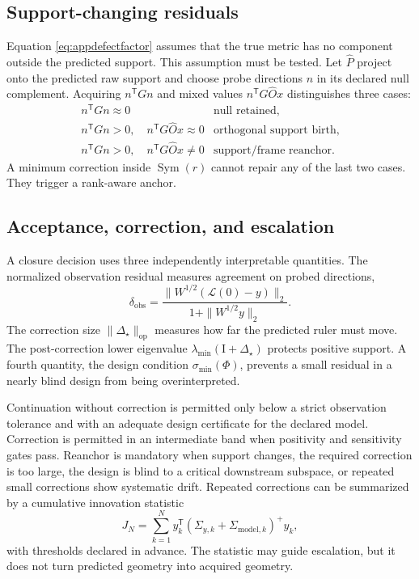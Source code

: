\documentclass[10pt,twocolumn]{article}
\theoremstyle{definition}
\theoremstyle{remark}
\newcommand{\Id}{\mathrm I}
\newcommand{\op}{\mathrm{op}}
\begin{document}
\subsection{Support-changing residuals}

Equation \eqref{eq:appdefectfactor} assumes that the true metric has no
component outside the predicted support.  This assumption must be tested.
Let $\widehat P$ project onto the predicted raw support and choose probe
directions $n$ in its declared null complement.  Acquiring
$n^{\mathsf T}Gn$ and mixed values
$n^{\mathsf T}G\widehat O x$ distinguishes three cases:
\begin{equation}
\begin{array}{cl}
n^{\mathsf T}Gn\approx0
&\text{null retained},\\
n^{\mathsf T}Gn>0,\quad
n^{\mathsf T}G\widehat O x\approx0
&\text{orthogonal support birth},\\
n^{\mathsf T}Gn>0,\quad
n^{\mathsf T}G\widehat O x\neq0
&\text{support/frame reanchor}.
\end{array}
\label{eq:appsupportcases}
\end{equation}
A minimum correction inside $\operatorname{Sym}(r)$ cannot repair any of the
last two cases.  They trigger a rank-aware anchor.

\subsection{Acceptance, correction, and escalation}

A closure decision uses three independently interpretable quantities.  The
normalized observation residual measures agreement on probed directions,
\begin{equation}
 \delta_{\mathrm{obs}}
 =\frac{\|W^{1/2}(\mathcal L(0)-y)\|_2}
 {1+\|W^{1/2}y\|_2}.
 \label{eq:appobsres}
\end{equation}
The correction size $\|\Delta_\star\|_{\op}$ measures how far the predicted
ruler must move.  The post-correction lower eigenvalue
$\lambda_{\min}(\Id+\Delta_\star)$ protects positive support.  A fourth
quantity, the design condition $\sigma_{\min}(\Phi)$, prevents a small
residual in a nearly blind design from being overinterpreted.

Continuation without correction is permitted only below a strict observation
tolerance and with an adequate design certificate for the declared model.
Correction is permitted in an intermediate band when positivity and
sensitivity gates pass.  Reanchor is mandatory when support changes, the
required correction is too large, the design is blind to a critical
downstream subspace, or repeated small corrections show systematic drift.
Repeated corrections can be summarized by a cumulative innovation statistic
\begin{equation}
 J_N=\sum_{k=1}^N
 y_k^{\mathsf T}
 (\Sigma_{y,k}+\Sigma_{\mathrm{model},k})^+
 y_k ,
 \label{eq:appinnovation}
\end{equation}
with thresholds declared in advance.  The statistic may guide escalation,
but it does not turn predicted geometry into acquired geometry.
\end{document}
